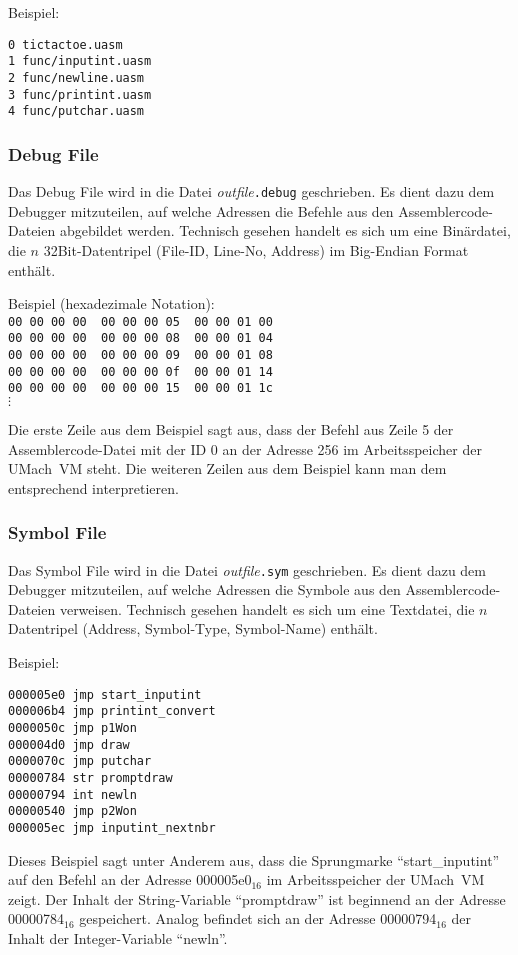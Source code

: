 Beispiel:
\begin{lstlisting}
0 tictactoe.uasm
1 func/inputint.uasm
2 func/newline.uasm
3 func/printint.uasm
4 func/putchar.uasm
\end{lstlisting}

\subsubsection{Debug File}

Das Debug File wird in die Datei \emph{outfile}\texttt{.debug} geschrieben.
Es dient dazu dem Debugger mitzuteilen, auf welche Adressen die Befehle aus den
Assemblercode-Dateien abgebildet werden. Technisch gesehen handelt es sich um
eine Binärdatei, die $n$ 32Bit-Datentripel (File-ID, Line-No, Address) im
Big-Endian Format enthält.

Beispiel (hexadezimale Notation):\\
\texttt{00 00 00 00 \vline\ 00 00 00 05 \vline\ 00 00 01 00}\\
\texttt{00 00 00 00 \vline\ 00 00 00 08 \vline\ 00 00 01 04}\\
\texttt{00 00 00 00 \vline\ 00 00 00 09 \vline\ 00 00 01 08}\\
\texttt{00 00 00 00 \vline\ 00 00 00 0f \vline\ 00 00 01 14}\\
\texttt{00 00 00 00 \vline\ 00 00 00 15 \vline\ 00 00 01 1c}\\
$\vdots$

Die erste Zeile aus dem Beispiel sagt aus, dass der Befehl aus Zeile 5 der
Assemblercode-Datei mit der ID 0 an der Adresse 256 im Arbeitsspeicher der
UMach~VM steht. Die weiteren Zeilen aus dem Beispiel kann man dem entsprechend
interpretieren.

\subsubsection{Symbol File}

Das Symbol File wird in die Datei \emph{outfile}\texttt{.sym} geschrieben.
Es dient dazu dem Debugger mitzuteilen, auf welche Adressen die Symbole aus den
Assemblercode-Dateien verweisen. Technisch gesehen handelt es sich um eine
Textdatei, die $n$ Datentripel (Address, Symbol-Type, Symbol-Name) enthält.

Beispiel:
\begin{lstlisting}
000005e0 jmp start_inputint
000006b4 jmp printint_convert
0000050c jmp p1Won
000004d0 jmp draw
0000070c jmp putchar
00000784 str promptdraw
00000794 int newln
00000540 jmp p2Won
000005ec jmp inputint_nextnbr
\end{lstlisting}

Dieses Beispiel sagt unter Anderem aus, dass die Sprungmarke ``start\_inputint''
auf den Befehl an der Adresse 000005e0$_{16}$ im Arbeitsspeicher der UMach~VM
zeigt. Der Inhalt der String-Variable ``promptdraw'' ist beginnend an der Adresse
00000784$_{16}$ gespeichert. Analog befindet sich an der Adresse 00000794$_{16}$
der Inhalt der Integer-Variable ``newln''.
